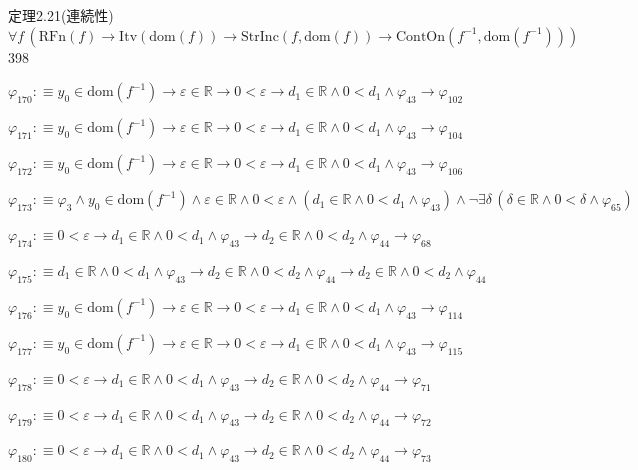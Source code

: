 \begin{fullproof}{定理2.21(連続性)}{$\forall f\,(\mathrm{RFn}(f) \to \mathrm{Itv}(\mathrm{dom}(f)) \to \mathrm{StrInc}(f,\mathrm{dom}(f)) \to \mathrm{ContOn}(f^{-1},\mathrm{dom}(f^{-1})))$}{398}
\begin{abbrevlist}
\item $\varphi_{170} :\equiv y_{0} \in \mathrm{dom}(f^{-1}) \to \varepsilon \in \mathbb{R} \to 0 < \varepsilon \to d_{1} \in \mathbb{R} \land 0 < d_{1} \land \varphi_{43} \to \varphi_{102}$
\item $\varphi_{171} :\equiv y_{0} \in \mathrm{dom}(f^{-1}) \to \varepsilon \in \mathbb{R} \to 0 < \varepsilon \to d_{1} \in \mathbb{R} \land 0 < d_{1} \land \varphi_{43} \to \varphi_{104}$
\item $\varphi_{172} :\equiv y_{0} \in \mathrm{dom}(f^{-1}) \to \varepsilon \in \mathbb{R} \to 0 < \varepsilon \to d_{1} \in \mathbb{R} \land 0 < d_{1} \land \varphi_{43} \to \varphi_{106}$
\item $\varphi_{173} :\equiv \varphi_{3} \land y_{0} \in \mathrm{dom}(f^{-1}) \land \varepsilon \in \mathbb{R} \land 0 < \varepsilon \land (d_{1} \in \mathbb{R} \land 0 < d_{1} \land \varphi_{43}) \land \neg \exists \delta\,(\delta \in \mathbb{R} \land 0 < \delta \land \varphi_{65})$
\item $\varphi_{174} :\equiv 0 < \varepsilon \to d_{1} \in \mathbb{R} \land 0 < d_{1} \land \varphi_{43} \to d_{2} \in \mathbb{R} \land 0 < d_{2} \land \varphi_{44} \to \varphi_{68}$
\item $\varphi_{175} :\equiv d_{1} \in \mathbb{R} \land 0 < d_{1} \land \varphi_{43} \to d_{2} \in \mathbb{R} \land 0 < d_{2} \land \varphi_{44} \to d_{2} \in \mathbb{R} \land 0 < d_{2} \land \varphi_{44}$
\item $\varphi_{176} :\equiv y_{0} \in \mathrm{dom}(f^{-1}) \to \varepsilon \in \mathbb{R} \to 0 < \varepsilon \to d_{1} \in \mathbb{R} \land 0 < d_{1} \land \varphi_{43} \to \varphi_{114}$
\item $\varphi_{177} :\equiv y_{0} \in \mathrm{dom}(f^{-1}) \to \varepsilon \in \mathbb{R} \to 0 < \varepsilon \to d_{1} \in \mathbb{R} \land 0 < d_{1} \land \varphi_{43} \to \varphi_{115}$
\item $\varphi_{178} :\equiv 0 < \varepsilon \to d_{1} \in \mathbb{R} \land 0 < d_{1} \land \varphi_{43} \to d_{2} \in \mathbb{R} \land 0 < d_{2} \land \varphi_{44} \to \varphi_{71}$
\item $\varphi_{179} :\equiv 0 < \varepsilon \to d_{1} \in \mathbb{R} \land 0 < d_{1} \land \varphi_{43} \to d_{2} \in \mathbb{R} \land 0 < d_{2} \land \varphi_{44} \to \varphi_{72}$
\item $\varphi_{180} :\equiv 0 < \varepsilon \to d_{1} \in \mathbb{R} \land 0 < d_{1} \land \varphi_{43} \to d_{2} \in \mathbb{R} \land 0 < d_{2} \land \varphi_{44} \to \varphi_{73}$

\end{abbrevlist}
\end{fullproof}
